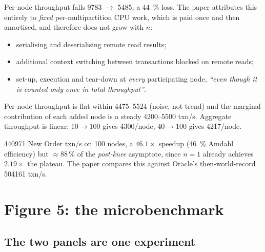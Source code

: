 \documentclass[11pt,a4paper]{article}
\begin{document}
\begin{description}[leftmargin=1.2em, itemsep=3pt]
\item[$1\to10$ nodes: the knee.] Per-node throughput falls
      \num{9783} $\to$ \num{5485}, a \SI{44}{\percent} loss.  The paper
      attributes this entirely to \emph{fixed} per-multipartition CPU work,
      which is paid once and then amortised, and therefore does not grow
      with $n$:
      \begin{itemize}[leftmargin=1.2em,itemsep=1pt]
      \item serialising and deserialising remote read results;
      \item additional context switching between transactions blocked on
            remote reads;
      \item set-up, execution and tear-down at \emph{every} participating
            node, \emph{``even though it is counted only once in total
            throughput''}.
      \end{itemize}
\item[$\boldsymbol{n\gtrsim10}$: the plateau.] Per-node throughput is flat
      within \num{4475}--\num{5524} (noise, not trend) and the marginal
      contribution of each added node is a steady
      $\num{4200}$--$\num{5500}$ txn/s.  Aggregate throughput is linear:
      $10\to100$ gives \num{4300}/node, $40\to100$ gives
      \num{4217}/node.
\item[Headline.] \num{440971} New Order txn/s on 100 nodes,
      a $46.1\times$ speedup (\SI{46}{\percent} Amdahl efficiency) but
      $\approx88\,\%$ of the \emph{post-knee} asymptote, since
      $n=1$ already achieves $2.19\times$ the plateau.  The paper compares
      this against Oracle's then-world-record \num{504161} txn/s.
\end{description}

\section{Figure 5: the microbenchmark}
\label{sec:fig5}

\subsection{The two panels are one experiment}
\end{document}
